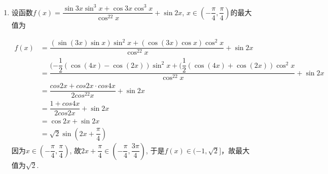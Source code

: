 \begin{enumerate}
\begin{enumerate}
        \begin{jieda}
            $tan\dfrac{3\alpha}{2} - tan\dfrac{\alpha}{2} = \dfrac{sin\dfrac{3\alpha}{2}}{cos\dfrac{3\alpha}{2}} - \dfrac{sin\dfrac{\alpha}{2}}{cos\dfrac{\alpha}{2}} = \dfrac{sin\dfrac{3\alpha}{2}\cdot cos\dfrac{\alpha}{2} - cos\dfrac{3\alpha}{2}\cdot sin\dfrac{\alpha}{2}}{cos\dfrac{3\alpha}{2} \cdot cos\dfrac{\alpha}{2}} = \dfrac{sin\alpha}{\dfrac{1}{2}[cos2\alpha + cos\alpha]} = m$.
        \end{jieda}
            \item 设函数$f(x)=\dfrac{\sin3x\sin^3x+\cos3x\cos^3x}{\cos^22x}+\sin2x$, $x\in\left(-\dfrac{\pi}{4},\dfrac{\pi}{4}\right)$的最大值为
            \begin{jieda}
            \begin{align*}
            f(x)
            & = \dfrac{(\sin(3x)\sin x)\sin^2x+(\cos(3x)\cos x)\cos^2x}{\cos^22x}+\sin2x \\
            & = \dfrac{(-\dfrac{1}{2}(\cos(4x)-\cos(2x))\sin^2x+(\dfrac{1}{2}(\cos(4x)+\cos(2x))\cos^2x}{\cos^22x}+\sin2x \\
            & = \dfrac{cos2x+cos2x \cdot cos4x}{2cos^22x} +\sin2x \\
            & = \dfrac{1 + cos4x}{2cos2x} +\sin2x \\
            & = \cos2x+\sin2x\\
            & = \sqrt{2}\sin\left(2x+\dfrac{\pi}{4}\right)
            \end{align*}
            因为$x\in\left(-\dfrac{\pi}{4},\dfrac{\pi}{4}\right)$, 故$2x+\dfrac{\pi}{4}\in\left(-\dfrac{\pi}{4},\dfrac{3\pi}{4}\right)$, 
            于是$f(x)\in(-1,\sqrt{2}]$，故最大值为$\sqrt{2}$.
            \end{jieda}
            \end{enumerate}


\end{enumerate}
